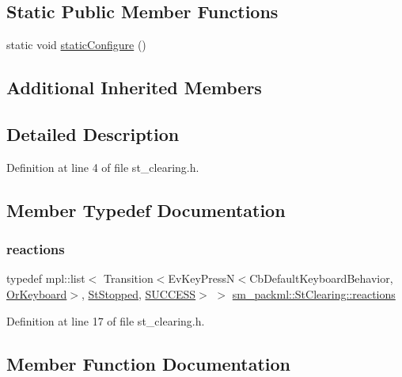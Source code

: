 \subsection*{Static Public Member Functions}
\begin{DoxyCompactItemize}
\item 
static void \hyperlink{structsm__packml_1_1StClearing_a2d4a6d6ec599117628988a5ce18bab8a}{static\+Configure} ()
\end{DoxyCompactItemize}
\subsection*{Additional Inherited Members}


\subsection{Detailed Description}


Definition at line 4 of file st\+\_\+clearing.\+h.



\subsection{Member Typedef Documentation}
\mbox{\label{structsm__packml_1_1StClearing_afc7ff77e88b7240de8776e08c3bda91d}} 
\subsubsection{\texorpdfstring{reactions}{reactions}}
{\footnotesize\ttfamily typedef mpl\+::list$<$ Transition$<$Ev\+Key\+PressN$<$Cb\+Default\+Keyboard\+Behavior, \hyperlink{classsm__packml_1_1OrKeyboard}{Or\+Keyboard}$>$, \hyperlink{structsm__packml_1_1StStopped}{St\+Stopped}, \hyperlink{classSUCCESS}{S\+U\+C\+C\+E\+SS}$>$ $>$ \hyperlink{structsm__packml_1_1StClearing_afc7ff77e88b7240de8776e08c3bda91d}{sm\+\_\+packml\+::\+St\+Clearing\+::reactions}}



Definition at line 17 of file st\+\_\+clearing.\+h.



\subsection{Member Function Documentation}
\mbox{\label{structsm__packml_1_1StClearing_aa01b5557a7978b55920681ac846849b9}} 
